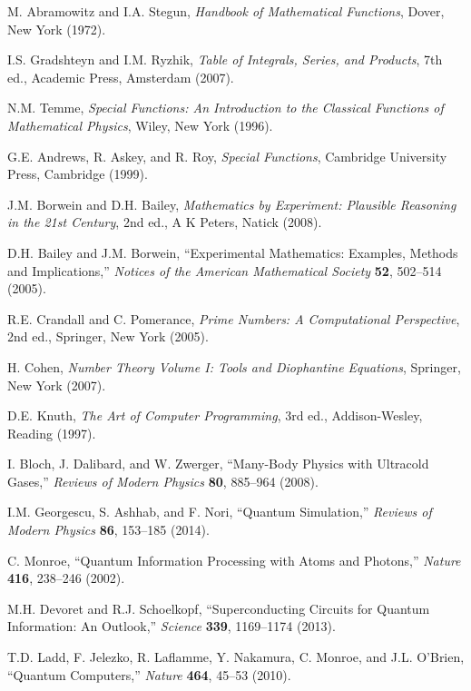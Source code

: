 \documentclass[11pt]{article}
\theoremstyle{plain}
\theoremstyle{definition}
\theoremstyle{remark}
\begin{document}
\begin{thebibliography}{99}
 M. Abramowitz and I.A. Stegun, \emph{Handbook of Mathematical Functions}, Dover, New York (1972).

 I.S. Gradshteyn and I.M. Ryzhik, \emph{Table of Integrals, Series, and Products}, 7th ed., Academic Press, Amsterdam (2007).

 N.M. Temme, \emph{Special Functions: An Introduction to the Classical Functions of Mathematical Physics}, Wiley, New York (1996).

 G.E. Andrews, R. Askey, and R. Roy, \emph{Special Functions}, Cambridge University Press, Cambridge (1999).

 J.M. Borwein and D.H. Bailey, \emph{Mathematics by Experiment: Plausible Reasoning in the 21st Century}, 2nd ed., A K Peters, Natick (2008).

 D.H. Bailey and J.M. Borwein, ``Experimental Mathematics: Examples, Methods and Implications,'' \emph{Notices of the American Mathematical Society} \textbf{52}, 502--514 (2005).

 R.E. Crandall and C. Pomerance, \emph{Prime Numbers: A Computational Perspective}, 2nd ed., Springer, New York (2005).

 H. Cohen, \emph{Number Theory Volume I: Tools and Diophantine Equations}, Springer, New York (2007).

 D.E. Knuth, \emph{The Art of Computer Programming}, 3rd ed., Addison-Wesley, Reading (1997).

 I. Bloch, J. Dalibard, and W. Zwerger, ``Many-Body Physics with Ultracold Gases,'' \emph{Reviews of Modern Physics} \textbf{80}, 885--964 (2008).

 I.M. Georgescu, S. Ashhab, and F. Nori, ``Quantum Simulation,'' \emph{Reviews of Modern Physics} \textbf{86}, 153--185 (2014).

 C. Monroe, ``Quantum Information Processing with Atoms and Photons,'' \emph{Nature} \textbf{416}, 238--246 (2002).

 M.H. Devoret and R.J. Schoelkopf, ``Superconducting Circuits for Quantum Information: An Outlook,'' \emph{Science} \textbf{339}, 1169--1174 (2013).

 T.D. Ladd, F. Jelezko, R. Laflamme, Y. Nakamura, C. Monroe, and J.L. O'Brien, ``Quantum Computers,'' \emph{Nature} \textbf{464}, 45--53 (2010).

\end{thebibliography}
\end{document}
